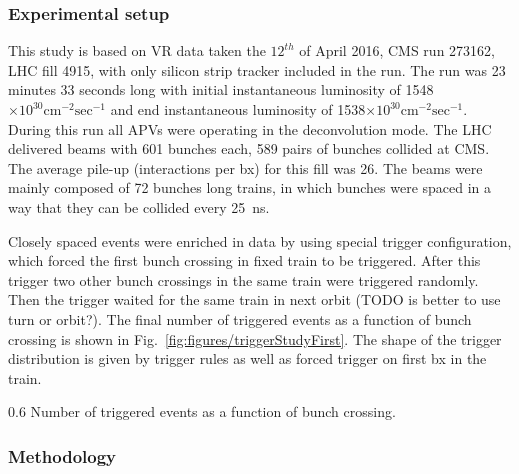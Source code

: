 \subsubsection{Experimental setup} 

This study is based on VR data taken the $12^{th}$ of April 2016, CMS run 273162, LHC fill 4915, with only silicon strip tracker included in the run. The run was 23 minutes 33 seconds long with initial instantaneous luminosity of 1548$\times 10^{30} \mathrm{cm^{-2} sec^{-1}}$ and end instantaneous luminosity of 1538$\times 10^{30} \mathrm{cm^{-2} sec^{-1}}$. During this run all APVs were operating in the deconvolution mode. The LHC delivered beams with 601 bunches each, 589 pairs of bunches collided at CMS. The average pile-up (interactions per bx) for this fill was 26. The beams were mainly composed of 72 bunches long trains, in which bunches were spaced in a way that they can be collided every 25~ns.

Closely spaced events were enriched in data by using special trigger configuration, which forced the first bunch crossing in fixed train to be triggered. After this trigger two other bunch crossings in the same train were triggered randomly. Then the trigger waited for the same train in next orbit (TODO is better to use turn or orbit?). The final number of triggered events as a function of bunch crossing is shown in Fig.~\ref{fig:figures/triggerStudyFirst}. The shape of the trigger distribution is given by trigger rules as well as forced trigger on first bx in the train.


                 {0.6}       %
                 {Number of triggered events as a function of bunch crossing.} %


 \subsubsection{Methodology}
 

